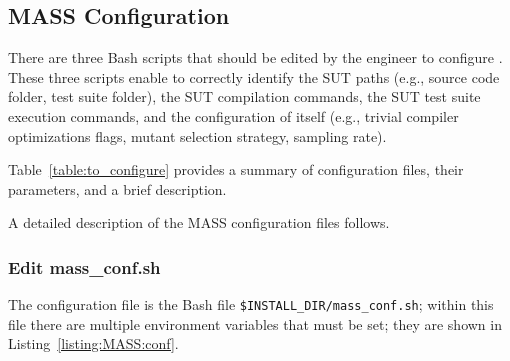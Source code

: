 \subsection{MASS Configuration}

There are three Bash scripts that should be edited by the engineer to configure \MASS. These three scripts enable \MASS to correctly identify the SUT paths (e.g., source code folder, test suite folder), the SUT compilation commands, the SUT test suite execution commands, and the configuration of \MASS itself (e.g., trivial compiler optimizations flags, mutant selection strategy, sampling rate).




Table~\ref{table:to_configure} provides a summary of \MASS configuration files, their parameters, and a brief description.


A detailed description of the MASS configuration files follows.

\subsubsection{Edit mass\_conf.sh}

The \MASS configuration file is the Bash file \texttt{\$INSTALL\_DIR/mass\_conf.sh}; within this file there are multiple environment variables that must be set; they are shown in Listing~\ref{listing:MASS:conf}.


